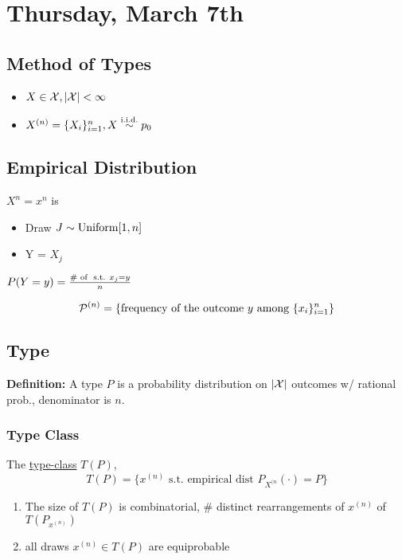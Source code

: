 \section{Thursday, March 7th}
\subsection{Method of Types}
\begin{itemize}
    \item $X\in \mathcal{X}, |\mathcal{X}|<\infty$
    \item $X^{(n)} = \{X_i\}_{i=1}^n, X\overset{\text{i.i.d.}}{\sim} p_0$
\end{itemize}

\subsection{Empirical Distribution}
$X^{n} = x^{n}$ is 
\begin{itemize}
    \item Draw $J \sim \text{Uniform}[1, n]$
    \item Y = $X_j$
\end{itemize}
$P(Y = y) = \frac{\# \text{ of } \text{ s.t. } x_j = y}{n}$

\begin{equation}
    \mathcal{P}^{(n)} = \{\text{frequency of the outcome } y \text{ among } \{x_{i}\}_{i=1}^n\}
\end{equation}

\subsection{Type}
\textbf{Definition:} A type $P$ is a probability distribution on $|\mathcal{X}|$ outcomes w/ rational prob., denominator is $n$.

\subsubsection{Type Class}
The \underline{type-class} $T(P)$, 
\begin{equation}
    T(P) = \{ x^{(n)} \text{ s.t. empirical dist } P_{X^{(n}}(\cdot)=P\}
\end{equation}
\begin{enumerate}
    \item The size of $T(P)$ is combinatorial, \# distinct rearrangements of $x^{(n)}$ of $T(P_{x^{(n)}})$
    \item all draws $x^{(n)}\in T(P)$ are equiprobable
\end{enumerate}

